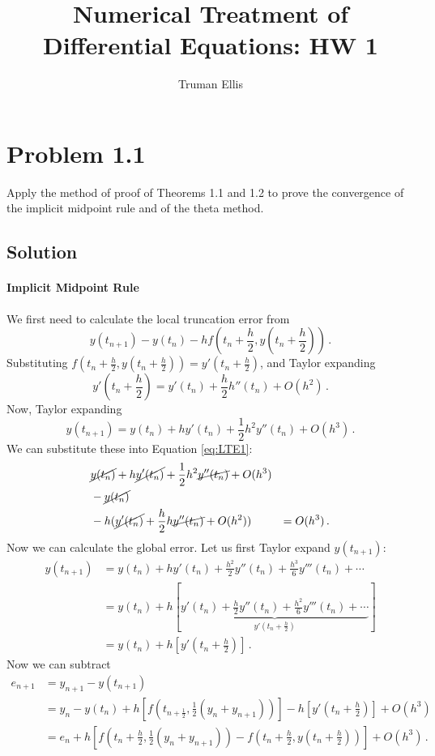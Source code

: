 \documentclass[10pt,letterpaper]{article}
\title{Numerical Treatment of Differential Equations: HW 1}
\author{Truman Ellis}
\begin{document}
\maketitle

\section*{Problem 1.1}
Apply the method of proof of Theorems 1.1 and 1.2 to prove the convergence of the implicit midpoint rule and of the theta method.

\subsection*{Solution}
\paragraph*{Implicit Midpoint Rule} We first need to calculate the local truncation error from
\begin{equation}\label{eq:LTE1}
y(t_{n+1})-y(t_n)-hf\left(t_n+\frac{h}{2},y\left(t_n+\frac{h}{2}\right)\right)\,.
\end{equation}
Substituting $f(t_n+\frac{h}{2},y(t_n+\frac{h}{2})) = y'(t_n+\frac{h}{2})$, and Taylor expanding
\[
y'\left(t_n+\frac{h}{2}\right)=y'(t_n)+\frac{h}{2}h''(t_n)+O(h^2)\,.
\]
Now, Taylor expanding 
\[
y(t_{n+1})=y(t_n)+hy'(t_n)+\frac{1}{2}h^2y''(t_n)+O(h^3)\,.
\]
We can substitute these into Equation \ref{eq:LTE1}:
\begin{align*}
&\cancel{y(t_n)}+h\cancel{y'(t_n)}+\frac{1}{2}h^2\cancel{y''(t_n)}+O(h^3)\\
&-\cancel{y(t_n)}\\
&-h(\cancel{y'(t_n)}+\frac{h}{2}h\cancel{y''(t_n)}+O(h^2))
&=O(h^3)\,.
\end{align*}
Now we can calculate the global error. Let us first Taylor expand $y(t_{n+1})$:
\begin{align*}
y(t_{n+1})&=y(t_n)+hy'(t_n)+\frac{h^2}{2}y''(t_n)+\frac{h^3}{6}y'''(t_n)+\cdots\\
&=y(t_n)+h[\underbrace{y'(t_n)+\frac{h}{2}y''(t_n)+\frac{h^2}{6}y'''(t_n)+\cdots}_
{\displaystyle y'\left(t_n+\frac{h}{2}\right)}
]\\
&=y(t_n)+h\left[y'\left(t_n+\frac{h}{2}\right)\right]\,.
\end{align*}
Now we can subtract
\begin{align*}
e_{n+1}&=y_{n+1}-y(t_{n+1})\\
&=y_n-y(t_n)+h\left[f\left(t_{n+\frac{1}{2}},\frac{1}{2}(y_n+y_{n+1})\right)\right]-h\left[y'\left(t_n+\frac{h}{2}\right)\right]+O(h^3)\\
&=e_n+h\left[f\left(t_n+\frac{h}{2},\frac{1}{2}(y_n+y_{n+1})\right)-f\left(t_n+\frac{h}{2},y(t_n+\frac{h}{2})\right)\right]+O(h^3)\,.
\end{align*}
\end{document}
